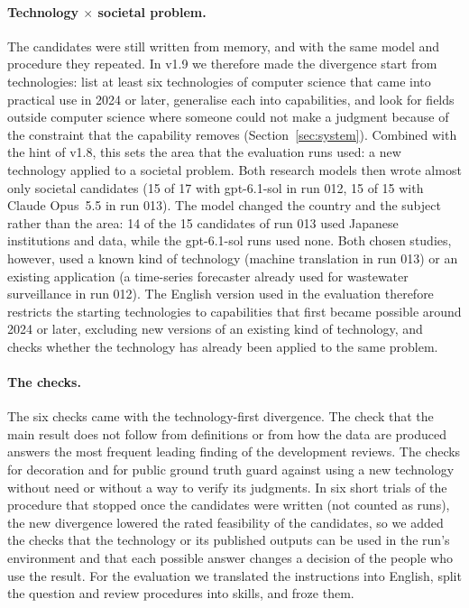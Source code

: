 \documentclass[11pt]{article}
\begin{document}
\paragraph{Technology $\times$ societal problem.} The candidates were still written from memory, and with the same model and procedure they repeated. In v1.9 we therefore made the divergence start from technologies: list at least six technologies of computer science that came into practical use in 2024 or later, generalise each into capabilities, and look for fields outside computer science where someone could not make a judgment because of the constraint that the capability removes (Section~\ref{sec:system}). Combined with the hint of v1.8, this sets the area that the evaluation runs used: a new technology applied to a societal problem. Both research models then wrote almost only societal candidates (15 of 17 with gpt-6.1-sol in run 012, 15 of 15 with Claude Opus~5.5 in run 013). The model changed the country and the subject rather than the area: 14 of the 15 candidates of run 013 used Japanese institutions and data, while the gpt-6.1-sol runs used none. Both chosen studies, however, used a known kind of technology (machine translation in run 013) or an existing application (a time-series forecaster already used for wastewater surveillance in run 012). The English version used in the evaluation therefore restricts the starting technologies to capabilities that first became possible around 2024 or later, excluding new versions of an existing kind of technology, and checks whether the technology has already been applied to the same problem.

\paragraph{The checks.} The six checks came with the technology-first divergence. The check that the main result does not follow from definitions or from how the data are produced answers the most frequent leading finding of the development reviews. The checks for decoration and for public ground truth guard against using a new technology without need or without a way to verify its judgments. In six short trials of the procedure that stopped once the candidates were written (not counted as runs), the new divergence lowered the rated feasibility of the candidates, so we added the checks that the technology or its published outputs can be used in the run's environment and that each possible answer changes a decision of the people who use the result. For the evaluation we translated the instructions into English, split the question and review procedures into skills, and froze them.
\end{document}
